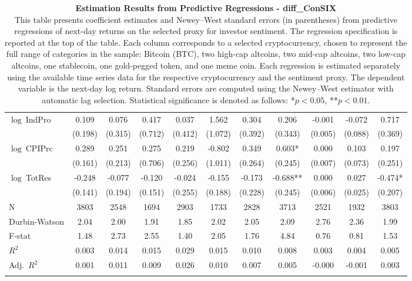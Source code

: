 \begin{table}[ht]
\begin{tabular}{l *{10}{c}}
\addlinespace
$\log\ $IndPro & 0.109 & 0.076 & 0.417 & 0.037 & 1.562 & 0.304 & 0.206 & -0.001 & -0.072 & 0.717 \\
 & (0.198) & (0.315) & (0.712) & (0.412) & (1.072) & (0.392) & (0.343) & (0.005) & (0.088) & (0.369) \\
\addlinespace
$\log\ $CPIPrc & 0.289 & 0.251 & 0.275 & 0.219 & -0.802 & 0.349 & 0.603* & 0.000 & 0.103 & 0.197 \\
 & (0.161) & (0.213) & (0.706) & (0.256) & (1.011) & (0.264) & (0.245) & (0.007) & (0.073) & (0.251) \\
\addlinespace
$\log\ $TotRes & -0.248 & -0.077 & -0.120 & -0.024 & -0.155 & -0.173 & -0.688** & 0.000 & 0.027 & -0.474* \\
 & (0.141) & (0.194) & (0.151) & (0.255) & (0.188) & (0.228) & (0.245) & (0.006) & (0.025) & (0.207) \\
\addlinespace
\midrule
N & 3803 & 2548 & 1694 & 2903 & 1733 & 2828 & 3713 & 2521 & 1932 & 3803 \\
Durbin-Watson & 2.04 & 2.00 & 1.91 & 1.85 & 2.02 & 2.05 & 2.09 & 2.76 & 2.36 & 1.99 \\
F-stat & 1.48 & 2.73 & 2.55 & 1.40 & 2.05 & 1.76 & 4.84 & 0.76 & 0.81 & 1.53 \\
\(R^2\) & 0.003 & 0.014 & 0.015 & 0.029 & 0.015 & 0.010 & 0.008 & 0.003 & 0.004 & 0.005 \\
Adj.\ \(R^2\) & 0.001 & 0.011 & 0.009 & 0.026 & 0.010 & 0.007 & 0.005 & -0.000 & -0.001 & 0.003 \\
\addlinespace
\midrule
\multicolumn{11}{c}{Specification tested: $R_{i,t+1} = \alpha_i + \beta_{sent} S_t + \phi R_{i,t} + \theta B_{i,t} + \gamma M_t + \varepsilon_{i,t+1}$}\\
\bottomrule
\end{tabular}
\caption{\textbf{Estimation Results from Predictive Regressions - diff_ConSIX} \\
This table presents coefficient estimates and Newey--West standard errors (in parentheses) from predictive regressions of next-day returns on the selected proxy for investor sentiment. The regression specification is reported at the top of the table. Each column corresponds to a selected cryptocurrency, chosen to represent the full range of categories in the sample: Bitcoin (BTC), two high-cap altcoins, two mid-cap altcoins, two low-cap altcoins, one stablecoin, one gold-pegged token, and one meme coin. Each regression is estimated separately using the available time series data for the respective cryptocurrency and the sentiment proxy. The dependent variable is the next-day log return. Standard errors are computed using the Newey--West estimator with automatic lag selection. Statistical significance is denoted as follows: *$p<0.05$, **$p<0.01$.}
\label{tab:diff_consix_result_h1}
\end{table}
